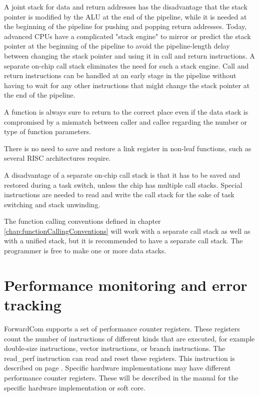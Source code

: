 \documentclass[forwardcom.tex]{subfiles}
\begin{document}
A joint stack for data and return addresses has the disadvantage that the stack pointer is modified by the ALU at the end of the pipeline, while it is needed at the beginning of the pipeline for pushing and popping return addresses. Today, advanced CPUs have a complicated "stack engine" to mirror or predict the stack pointer at the beginning of the pipeline to avoid the pipeline-length delay between changing the stack pointer and using it in call and return instructions. A separate on-chip call stack eliminates the need for such a stack engine. Call and return instructions can be handled at an early stage in the pipeline without having to wait for any other instructions that might change the stack pointer at the end of the pipeline.
\vv

A function is always sure to return to the correct place even if the data stack is compromised by a mismatch between caller and callee regarding the number or type of function parameters.
\vv

There is no need to save and restore a link register in non-leaf functions, such as several RISC architectures require.
\vv

A disadvantage of a separate on-chip call stack is that it has to be saved and restored during a task switch, unless the chip has multiple call stacks. Special instructions are needed to read and write the call stack for the sake of task switching and stack unwinding.
\vv

The function calling conventions defined in chapter \ref{chap:functionCallingConventions} will 
work with a separate call stack as well as with a unified stack, but it is recommended to have a separate call stack. The programmer is free to make one or more data stacks.
\vv


\section{Performance monitoring and error tracking}
ForwardCom supports a set of performance counter registers. These registers count the number of instructions of different kinds that are executed, for example double-size instructions, vector instructions, or branch instructions. The read\_perf instruction can read and reset these registers. This instruction is described on page \pageref{table:readPerfInstruction}. Specific hardware implementations may have different performance counter registers. These will be described in the manual for the specific hardware implementation or soft core.
\vv
\end{document}

